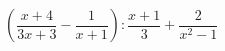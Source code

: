 \begin{ex}[type=expression]
	\begin{condition}
		\( \left( \dfrac{x+4}{3x+3}-\dfrac{1}{x+1} \right):\dfrac{x+1}{3}+\dfrac{2}{x^2-1} \)
	\end{condition}
\end{ex}